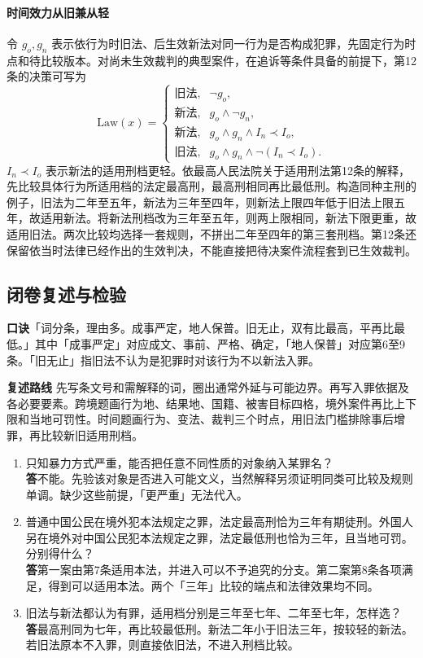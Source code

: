 \paragraph{时间效力\quad 从旧兼从轻}
令 \(g_o,g_n\) 表示依行为时旧法、后生效新法对同一行为是否构成犯罪，先固定行为时点和待比较版本。对尚未生效裁判的典型案件，在追诉等条件具备的前提下，第12条的决策可写为
\[
 \mathrm{Law}(x)=
 \begin{cases}
   \text{旧法},& \neg g_o,\\
   \text{新法},& g_o\land\neg g_n,\\
   \text{新法},& g_o\land g_n\land I_n\prec I_o,\\
   \text{旧法},& g_o\land g_n\land \neg(I_n\prec I_o).
 \end{cases}
\]
\(I_n\prec I_o\) 表示新法的适用刑档更轻。依最高人民法院关于适用刑法第12条的解释，先比较具体行为所适用档的法定最高刑，最高刑相同再比最低刑。构造同种主刑的例子，旧法为二年至五年，新法为三年至四年，则新法上限四年低于旧法上限五年，故适用新法。将新法刑档改为三年至五年，则两上限相同，新法下限更重，故适用旧法。两次比较均选择一套规则，不拼出二年至四年的第三套刑档。第12条还保留依当时法律已经作出的生效判决，不能直接把待决案件流程套到已生效裁判。

\subsection*{闭卷复述与检验}
\textbf{口诀}\quad「词分条，理由多。成事严定，地人保普。旧无止，双有比最高，平再比最低。」其中「成事严定」对应成文、事前、严格、确定，「地人保普」对应第6至9条。「旧无止」指旧法不认为是犯罪时对该行为不以新法入罪。

\textbf{复述路线}\quad
先写条文号和需解释的词，圈出通常外延与可能边界。再写入罪依据及各必要要素。跨境题画行为地、结果地、国籍、被害目标四格，境外案件再比上下限和当地可罚性。时间题画行为、变法、裁判三个时点，用旧法门槛排除事后增罪，再比较新旧适用刑档。

\begin{enumerate}
\item 只知暴力方式严重，能否把任意不同性质的对象纳入某罪名？\\
\textbf{答}\quad 不能。先验该对象是否进入可能文义，当然解释另须证明同类可比较及规则单调。缺少这些前提，「更严重」无法代入。
\item 普通中国公民在境外犯本法规定之罪，法定最高刑恰为三年有期徒刑。外国人另在境外对中国公民犯本法规定之罪，法定最低刑也恰为三年，且当地可罚。分别得什么？\\
\textbf{答}\quad 第一案由第7条适用本法，并进入可以不予追究的分支。第二案第8条各项满足，得到可以适用本法。两个「三年」比较的端点和法律效果均不同。
\item 旧法与新法都认为有罪，适用档分别是三年至七年、二年至七年，怎样选？\\
\textbf{答}\quad 最高刑同为七年，再比较最低刑。新法二年小于旧法三年，按较轻的新法。若旧法原本不入罪，则直接依旧法，不进入刑档比较。
\end{enumerate}

